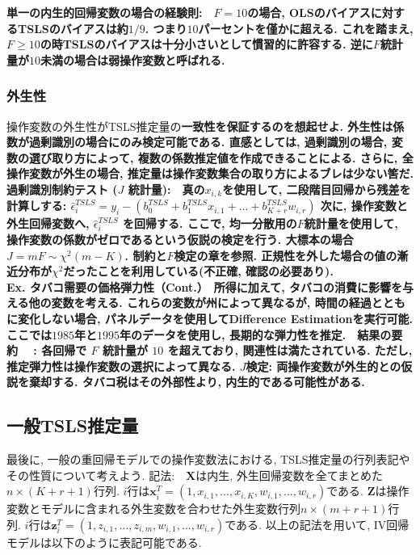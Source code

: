 \documentclass[paper=a4paper,fontsize=10pt]{jlreq}
\begin{document}
\rmfamily\mcfamily\bfseries{単一の内生的回帰変数の場合の経験則}\mdseries :　$F = 10$の場合, OLSのバイアスに対するTSLSのバイアスは約$1/9$. つまり$10$パーセントを僅かに超える. これを踏まえ, $F \geq 10$の時TSLSのバイアスは十分小さいとして慣習的に許容する. 逆に$F$統計量が$10$未満の場合は\rmfamily\mcfamily\bfseries{弱操作変数}\mdseries と呼ばれる.\\

\subsubsection{外生性}
操作変数の外生性がTSLS推定量の\rmfamily\mcfamily\bfseries{一致性}\mdseries を保証するのを想起せよ. 外生性は係数が過剰識別の場合にのみ検定可能である. 直感としては, 過剰識別の場合, 変数の選び取り方によって, 複数の係数推定値を作成できることによる. さらに, 全操作変数が外生の場合, 推定量は操作変数集合の取り方によるブレは少ない筈だ.\\

\rmfamily\mcfamily\bfseries{過剰識別制約テスト ($J$ 統計量)}\mdseries :　真の$x_{i,k}$を使用して, 二段階目回帰から残差を計算しする: $\hat{\epsilon}_i^{TSLS} = y_i - (b_0^{TSLS} + b_1^{TSLS} x_{i,1} + \dots + b_{K+r}^{TSLS} w_{i,r})$
次に, 操作変数と外生回帰変数へ, $\hat{\epsilon}_i^{TSLS}$ を回帰する. ここで, \rmfamily\mcfamily\bfseries{均一分散用の}\mdseries $F$統計量を使用して, 操作変数の係数がゼロであるという仮説の検定を行う. 大標本の場合 $J = mF \sim \chi^2(m - K)$. 制約と$F$検定の章を参照. 正規性を外した場合の値の漸近分布が$\chi^2$だったことを利用している(不正確, 確認の必要あり).\\

\rmfamily\mcfamily\bfseries{Ex. タバコ需要の価格弾力性（Cont.）}\mdseries　所得に加えて, タバコの消費に影響を与える他の変数を考える. これらの変数が州によって異なるが, 時間の経過とともに変化しない場合, \rmfamily\mcfamily\bfseries{パネルデータ}\mdseries を使用してDifference Estimationを実行可能. ここでは$1985$年と$1995$年のデータを使用し, 長期的な弾力性を推定.　\rmfamily\mcfamily\bfseries{結果の要約}\mdseries　 : 各回帰で $F$ 統計量が $10$ を超えており, 関連性は満たされている. ただし, 推定弾力性は操作変数の選択によって異なる. $J$検定: 両操作変数が外生的との仮説を棄却する. タバコ税はその外部性より, 内生的である可能性がある.\\

\subsection{一般TSLS推定量}
最後に, 一般の重回帰モデルでの操作変数法における, TSLS推定量の行列表記やその性質について考えよう. 記法:　$\mathbf{X}$は内生, 外生回帰変数を全てまとめた$n \times (K + r + 1)$行列. $i$行は$\mathbf{x}_i^T = (1, x_{i,1}, \dots, x_{i,K}, w_{i,1}, \dots, w_{i,r})$である. $\mathbf{Z}$は操作変数とモデルに含まれる外生変数を合わせた外生変数行列$n \times (m + r + 1)$行列. $i$行は$\mathbf{z}_i^T = (1, z_{i,1}, \dots, z_{i,m}, w_{i,1}, \dots, w_{i,r})$である. 以上の記法を用いて, IV回帰モデルは以下のように表記可能である.
\end{document}
